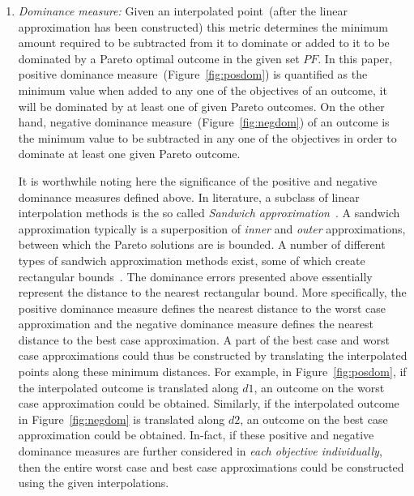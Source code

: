 {\color{blue}
	\begin{enumerate}
		\item \emph{Dominance measure:} Given an interpolated point~(after the linear approximation has been constructed) this metric determines the minimum amount required to be subtracted from it to dominate or added to it to be dominated by a Pareto optimal outcome in the given set $PF$. In this paper, positive dominance measure~(Figure~\ref{fig:posdom}) is quantified as the minimum value when added to any one of the objectives of an outcome, it will be dominated by at least one of given Pareto outcomes. On the other hand, negative dominance measure~(Figure~\ref{fig:negdom}) of an outcome is the minimum value to be subtracted in any one of the objectives in order to dominate at least one given Pareto outcome. 
		
		It is worthwhile noting here the significance of the positive and negative dominance measures defined above. In literature, a subclass of linear interpolation methods is the so called \textit{Sandwich approximation}~\cite{ruzika2005approximation}. A sandwich approximation typically is a superposition of \textit{inner} and \textit{outer} approximations, between which the Pareto solutions are is bounded. A number of different types of sandwich approximation methods exist, 
		some of which create rectangular bounds~\cite{payne1993efficient}. The dominance errors presented above essentially represent the distance to the nearest rectangular bound. More specifically, the positive dominance measure defines the nearest distance to the worst case approximation and the negative dominance measure defines the nearest distance to the best case approximation. A part of the best case and worst case approximations could thus be constructed by translating the interpolated points along these minimum distances. For example, in Figure~\ref{fig:posdom}, if the interpolated outcome is translated along $d1$, an outcome on the worst case approximation could be obtained. Similarly, if the interpolated outcome in Figure~\ref{fig:negdom} is translated along $d2$, an outcome on the best case approximation could be obtained. In-fact, if these positive and negative dominance measures are further considered in \emph{each objective individually}, then the entire worst case and best case approximations could be constructed using the given interpolations. 
		

\end{enumerate}}

